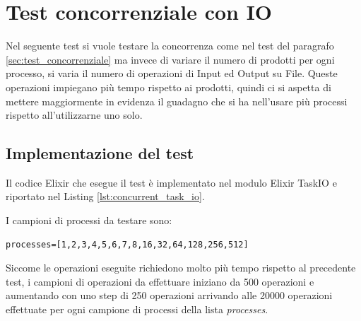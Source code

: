 \section{Test concorrenziale con IO}

Nel seguente test si vuole testare la concorrenza
come nel test del paragrafo \ref{sec:test_concorrenziale}
ma invece di variare il numero di prodotti per ogni
processo, si varia il numero di operazioni di Input
ed Output su File. Queste operazioni impiegano più tempo
rispetto ai prodotti, quindi ci si aspetta di mettere
maggiormente in evidenza il guadagno che si ha nell'usare più
processi rispetto all'utilizzarne uno solo.

\subsection{Implementazione del test}

Il codice Elixir che esegue il test è
implementato nel modulo Elixir TaskIO e
riportato nel Listing \ref{lst:concurrent_task_io}.

I campioni di processi da testare sono:

\begin{lstlisting}[language=none]
processes=[1,2,3,4,5,6,7,8,16,32,64,128,256,512]
\end{lstlisting}

Siccome le operazioni eseguite richiedono molto più tempo
rispetto al precedente test, i campioni di operazioni
da effettuare iniziano da 500 operazioni e aumentando con uno
step di 250 operazioni arrivando alle 20000 operazioni effettuate
per ogni campione di processi della lista \textit{processes}.


